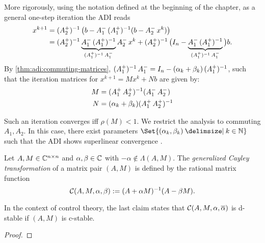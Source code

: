 More rigorously,
using the notation defined at the beginning of the chapter,
as a general one-step iteration the \ac{ADI} reads
\begin{equation*}
\begin{aligned}
  x^{k+1}
  &= \mathop{(\mathop{A_2^+})^{-1}} \big( b - \mathop{A_1^-} \mathop{(\mathop{A_1^+})^{-1}} (b - \mathop{A_2^-} x^k) \big) \\
  &= \mathop{(\mathop{A_2^+})^{-1}} \underbrace{
    \mathop{A_1^-} \mathop{(\mathop{A_1^+})^{-1}}
  }_{
    \mathop{(\mathop{A_1^+})^{-1}} \mathop{A_1^-}
  }
  \mathop{A_2^-} x^k + \mathop{(\mathop{A_2^+})^{-1}} \big( I_n - \underbrace{
    \mathop{A_1^-} \mathop{(\mathop{A_1^+})^{-1}}
  }_{
    \mathop{(\mathop{A_1^+})^{-1}} \mathop{A_1^-}
  }
  \big) b
  .
\end{aligned}
\end{equation*}
By \autoref{thm:adi:commuting-matrices},
$\mathop{(\mathop{A_1^+})^{-1}}\mathop{A_1^-} = I_n - (\alpha_k + \beta_k)\mathop{(\mathop{A_1^+})^{-1}}$,
such that the iteration matrices for $x^{k+1} = M x^k + N b$ are given by:
\begin{equation}
\label{eq:adi:general1step}
  \begin{aligned}
    M &= (\mathop{A_1^+}\mathop{A_2^+})^{-1} (\mathop{A_1^-}\mathop{A_2^-}) \\
    N &= (\alpha_k + \beta_k) (\mathop{A_1^+}\mathop{A_2^+})^{-1}
  \end{aligned}
\end{equation}

Such an iteration converges iff $\rho(M) < 1$.
We restrict the analysis to commuting $A_1, A_2$.
In this case,
there exist parameters $\Set{(\alpha_k, \beta_k) \given k\in\N}$
such that the \ac{ADI} shows
superlinear convergence \cite{Beckermann2010}.

\begin{lemma}
\label{thm:adi:cayley}
  Let $A, M\in\mathbb{C}^{n\times n}$ and $\alpha, \beta \in\mathbb{C}$ with $-\alpha\notin\Lambda(A, M)$.
  The \emph{generalized Cayley transformation} of a matrix pair $(A,M)$ is defined by
  the rational matrix function
  \begin{equation*}
    \mathcal{C}(A, M, \alpha, \beta) := (A+\alpha M)^{-1} (A-\beta M).
  \end{equation*}
\end{lemma}
\begin{remark}
  In the context of control theory,
  the last claim states that
  $\Cayley(A, M, \alpha, \conj\alpha)$ is d-stable if
  $(A, M)$ is c-stable.
\end{remark}
\begin{proof}
\end{proof}

